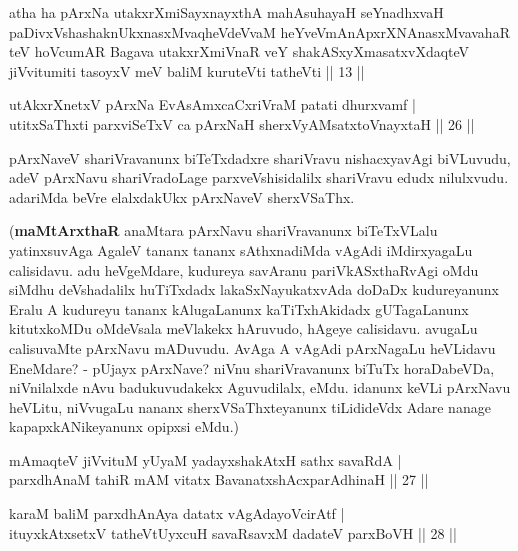 \begin{kandikeshl}
atha ha pArxNa utakxrXmiSayxnayxthA mahAsuhayaH seYnadhxvaH paDivxVshashaknUkxnasxMvaqheVdeVvaM heYveVmAnApxrXNAnasxMvavahaR teV hoVcumAR Bagava utakxrXmiVnaR veY shakASxyXmasatxvXdaqteV jiVvitumiti tasoyxV meV baliM kuruteVti tatheVti || 13 ||
\end{kandikeshl}


\begin{shl}
utAkxrXnetxV pArxNa EvAsAmxcaCxriVraM patati dhurxvamf | \\
utitxSaThxti parxviSeTxV ca pArxNaH sherxVyAMsatxtoV\s nayxtaH \hfill|| 26 || 
\end{shl}

\begin{artha}
pArxNaveV shariVravanunx biTeTxdadxre shariVravu nishacxyavAgi 
biVLuvudu, adeV pArxNavu shariVradoLage parxveVshisidalilx shariVravu 
edudx nilulxvudu. adariMda beVre elalxdakUkx pArxNaveV sherxVSaThx.
\end{artha}

\begin{artha}
(\textbf{maMtArxthaR} \ndash  anaMtara pArxNavu shariVravanunx biTeTxVLalu 
yatinxsuvAga AgaleV tananx tananx sAthxnadiMda vAgAdi iMdirxyagaLu 
calisidavu. adu heVgeMdare, kudureya savAranu pariVkASxthaRvAgi oMdu 
siMdhu deVshadalilx huTiTxdadx lakaSxNayukatxvAda doDaDx kudureyanunx 
Eralu A kudureyu tananx kAlugaLanunx kaTiTxhAkidadx gUTagaLanunx 
kitutxkoMDu oMdeVsala meVlakekx hAruvudo, hAgeye calisidavu. avugaLu 
calisuvaMte pArxNavu mADuvudu. AvAga A vAgAdi pArxNagaLu heVLidavu 
EneMdare? - pUjayx pArxNave? niVnu shariVravanunx biTuTx horaDabeVDa, 
niVnilalxde nAvu badukuvudakekx Aguvudilalx, eMdu. idanunx keVLi 
pArxNavu heVLitu, niVvugaLu nananx sherxVSaThxteyanunx tiLidideVdx 
Adare nanage kapapxkANikeyanunx opipxsi eMdu.)
\end{artha}


\begin{shl}
mAmaqteV jiVvituM yUyaM yadayxshakAtxH sathx savaRdA | \\
parxdhAnaM tahiR mAM vitatx BavanatxshAcxparAdhinaH \hfill|| 27 || 
\end{shl}

\begin{shl}
karaM baliM parxdhAnAya datatx vAgAdayoV\s cirAtf | \\
ituyxkAtxsetxV tatheVtUyxcuH savaRsavxM dadateV parxBoVH \hfill|| 28 || 
\end{shl}

